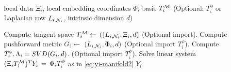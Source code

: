 \begin{algorithm}[H]
\renewcommand{\thealgorithm}{}
\label{alg:pullback} 
\caption{local data $\Xi_i$, local embedding coordinates $\Phi_{i}$ basis $T_i^{\cal M}$ (Optional: $T_i^\phi$ or Laplacian row $L_{i,{\cal N}_i}$, intrinsic dimension $d$)}
\begin{algorithmic}[1]
\STATE Compute tangent space $T_i^{\cal M} \gets$ \tppalg$(( L_{i,{\cal N}_i}, \Xi_{i}, d)$ (Optional import).
  \STATE Compute pushforward metric $G_i\gets$ \rmalg$( L_{i,{\cal N}_i}, \Phi_{i}, d)$ (Optional import $T_i^\phi$).
  \STATE Compute $T_i^\phi, \Lambda_i= {\sc SVD}(G_i, d)$. (Optional import $T_i^\phi$).
   \STATE Solve linear system $( \Xi_i {T_i^{\cal M}} )^T  Y_i \,=\,   \Phi_i {T_i^\phi} $ as in \eqref{eq:yi-manifold2}
   $Y_i$ 
\end{algorithmic}
\end{algorithm}




